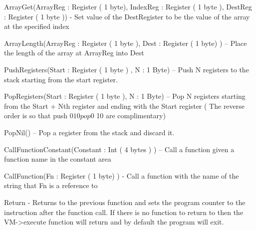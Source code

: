 \documentclass[]{final_report}
\begin{document}
ArrayGet(ArrayReg : Register ( 1 byte), IndexReg : Register ( 1 byte ), DestReg : Register ( 1
byte )) - Set value of the DestRegister to be the value of the array at the specified index

ArrayLength(ArrayReg : Register ( 1 byte ), Dest : Register ( 1 byte) ) – Place the length of the
array at ArrayReg into Dest

PushRegisters(Start : Register ( 1 byte ) , N : 1 Byte) – Push N registers to the stack starting from
the start register.

PopRegisters(Start : Register ( 1 byte ), N : 1 Byte) – Pop N registers starting from the Start + Nth
register and ending with the Start register ( The reverse order is so that push $0 10 pop $0 10 are
complimentary)

PopNil() – Pop a register from the stack and discard it.

CallFunctionConstant(Constant : Int ( 4 bytes ) ) – Call a function given a function name in the
constant area

CallFunction(Fn : Register ( 1 byte) ) - Call a function with the name of the string that Fn is a
reference to

Return - Returns to the previous function and sets the program counter to the instruction after the
function call. If there is no function to return to then the VM-\textgreater execute function will return and by default the program will exit.

\newpage
\begin{thebibliography}{99}
\end{thebibliography}
\label{endpage}
\end{document}
